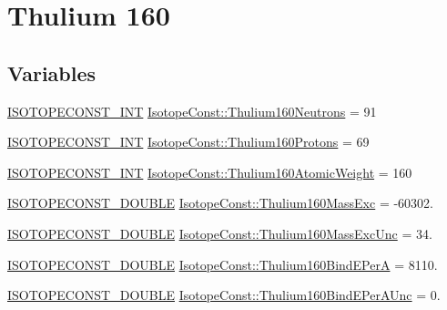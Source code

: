 \hypertarget{group___isotope_const-_thulium-_tm160}{}\section{Thulium 160}
\label{group___isotope_const-_thulium-_tm160}
\subsection*{Variables}
\begin{DoxyCompactItemize}
\item 
\mbox{\hyperlink{group___isotope_const-_macros_ga5f18360b3e99483a35c32d789e62621c}{I\+S\+O\+T\+O\+P\+E\+C\+O\+N\+S\+T\+\_\+\+I\+NT}} \mbox{\hyperlink{group___isotope_const-_thulium-_tm160_ga71f75e0d9400a627b832387327f04feb}{Isotope\+Const\+::\+Thulium160\+Neutrons}} = 91
\item 
\mbox{\hyperlink{group___isotope_const-_macros_ga5f18360b3e99483a35c32d789e62621c}{I\+S\+O\+T\+O\+P\+E\+C\+O\+N\+S\+T\+\_\+\+I\+NT}} \mbox{\hyperlink{group___isotope_const-_thulium-_tm160_ga376cfc438b9160185d3c3c15ec7c526d}{Isotope\+Const\+::\+Thulium160\+Protons}} = 69
\item 
\mbox{\hyperlink{group___isotope_const-_macros_ga5f18360b3e99483a35c32d789e62621c}{I\+S\+O\+T\+O\+P\+E\+C\+O\+N\+S\+T\+\_\+\+I\+NT}} \mbox{\hyperlink{group___isotope_const-_thulium-_tm160_gaa5e558457217c7dc149c400ba16f7f66}{Isotope\+Const\+::\+Thulium160\+Atomic\+Weight}} = 160
\item 
\mbox{\hyperlink{group___isotope_const-_macros_ga8f45a7272ce02c0b4c65c44636ed719a}{I\+S\+O\+T\+O\+P\+E\+C\+O\+N\+S\+T\+\_\+\+D\+O\+U\+B\+LE}} \mbox{\hyperlink{group___isotope_const-_thulium-_tm160_ga7b9d3340acd7fbec212bf2be3082b307}{Isotope\+Const\+::\+Thulium160\+Mass\+Exc}} = -\/60302.
\item 
\mbox{\hyperlink{group___isotope_const-_macros_ga8f45a7272ce02c0b4c65c44636ed719a}{I\+S\+O\+T\+O\+P\+E\+C\+O\+N\+S\+T\+\_\+\+D\+O\+U\+B\+LE}} \mbox{\hyperlink{group___isotope_const-_thulium-_tm160_ga11132dc8003e5fe40cd1a6346f1d2f0e}{Isotope\+Const\+::\+Thulium160\+Mass\+Exc\+Unc}} = 34.
\item 
\mbox{\hyperlink{group___isotope_const-_macros_ga8f45a7272ce02c0b4c65c44636ed719a}{I\+S\+O\+T\+O\+P\+E\+C\+O\+N\+S\+T\+\_\+\+D\+O\+U\+B\+LE}} \mbox{\hyperlink{group___isotope_const-_thulium-_tm160_ga557f2202b9ff39a731f3e83376a6d555}{Isotope\+Const\+::\+Thulium160\+Bind\+E\+PerA}} = 8110.
\item 
\mbox{\hyperlink{group___isotope_const-_macros_ga8f45a7272ce02c0b4c65c44636ed719a}{I\+S\+O\+T\+O\+P\+E\+C\+O\+N\+S\+T\+\_\+\+D\+O\+U\+B\+LE}} \mbox{\hyperlink{group___isotope_const-_thulium-_tm160_ga8f28b6d758d943f2aed58854289dd73f}{Isotope\+Const\+::\+Thulium160\+Bind\+E\+Per\+A\+Unc}} = 0.

\end{DoxyCompactItemize}
